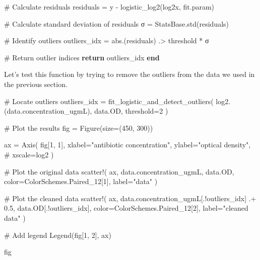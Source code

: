 \documentclass[
]{scrartcl}
\newenvironment{Shaded}{\begin{snugshade}}{\end{snugshade}}
\newcommand{\CommentTok}[1]{\textcolor[rgb]{0.37,0.37,0.37}{#1}}
\newcommand{\ControlFlowTok}[1]{\textcolor[rgb]{0.00,0.23,0.31}{\textbf{#1}}}
\newcommand{\FloatTok}[1]{\textcolor[rgb]{0.68,0.00,0.00}{#1}}
\newcommand{\FunctionTok}[1]{\textcolor[rgb]{0.28,0.35,0.67}{#1}}
\newcommand{\KeywordTok}[1]{\textcolor[rgb]{0.00,0.23,0.31}{\textbf{#1}}}
\newcommand{\NormalTok}[1]{\textcolor[rgb]{0.00,0.23,0.31}{#1}}
\newcommand{\OperatorTok}[1]{\textcolor[rgb]{0.37,0.37,0.37}{#1}}
\newcommand{\StringTok}[1]{\textcolor[rgb]{0.13,0.47,0.30}{#1}}
\begin{document}
\begin{Shaded}
\begin{Highlighting}[]
    \CommentTok{\# Calculate residuals}
\NormalTok{    residuals }\OperatorTok{=}\NormalTok{ y }\OperatorTok{{-}} \FunctionTok{logistic\_log2}\NormalTok{(log2x, fit.param)}

    \CommentTok{\# Calculate standard deviation of residuals}
\NormalTok{    σ }\OperatorTok{=}\NormalTok{ StatsBase.}\FunctionTok{std}\NormalTok{(residuals)}

    \CommentTok{\# Identify outliers}
\NormalTok{    outliers\_idx }\OperatorTok{=} \FunctionTok{abs}\NormalTok{.(residuals) }\OperatorTok{.\textgreater{}}\NormalTok{ threshold }\OperatorTok{*}\NormalTok{ σ}

    \CommentTok{\# Return outlier indices}
    \ControlFlowTok{return}\NormalTok{ outliers\_idx}
\KeywordTok{end}
\end{Highlighting}
\end{Shaded}

Let's test this function by trying to remove the outliers from the data
we used in the previous section.

\begin{Shaded}
\begin{Highlighting}[]
\CommentTok{\# Locate outliers}
\NormalTok{outliers\_idx }\OperatorTok{=} \FunctionTok{fit\_logistic\_and\_detect\_outliers}\NormalTok{(}
    \FunctionTok{log2}\NormalTok{.(data.concentration\_ugmL), data.OD, threshold}\OperatorTok{=}\FloatTok{2}
\NormalTok{)}

\CommentTok{\# Plot the results}
\NormalTok{fig }\OperatorTok{=} \FunctionTok{Figure}\NormalTok{(size}\OperatorTok{=}\NormalTok{(}\FloatTok{450}\NormalTok{, }\FloatTok{300}\NormalTok{))}

\NormalTok{ax }\OperatorTok{=} \FunctionTok{Axis}\NormalTok{(}
\NormalTok{    fig[}\FloatTok{1}\NormalTok{, }\FloatTok{1}\NormalTok{],}
\NormalTok{    xlabel}\OperatorTok{=}\StringTok{"antibiotic concentration"}\NormalTok{,}
\NormalTok{    ylabel}\OperatorTok{=}\StringTok{"optical density"}\NormalTok{,}
    \CommentTok{\# xscale=log2}
\NormalTok{)}

\CommentTok{\# Plot the original data}
\FunctionTok{scatter!}\NormalTok{(}
\NormalTok{    ax,}
\NormalTok{    data.concentration\_ugmL,}
\NormalTok{    data.OD,}
\NormalTok{    color}\OperatorTok{=}\NormalTok{ColorSchemes.Paired\_12[}\FloatTok{1}\NormalTok{],}
\NormalTok{    label}\OperatorTok{=}\StringTok{"data"}
\NormalTok{)}

\CommentTok{\# Plot the cleaned data}
\FunctionTok{scatter!}\NormalTok{(}
\NormalTok{    ax,}
\NormalTok{    data.concentration\_ugmL[.!outliers\_idx] }\OperatorTok{.+} \FloatTok{0.5}\NormalTok{,}
\NormalTok{    data.OD[.!outliers\_idx], color}\OperatorTok{=}\NormalTok{ColorSchemes.Paired\_12[}\FloatTok{2}\NormalTok{],}
\NormalTok{    label}\OperatorTok{=}\StringTok{"cleaned data"}
\NormalTok{)}

\CommentTok{\# Add legend}
\FunctionTok{Legend}\NormalTok{(fig[}\FloatTok{1}\NormalTok{, }\FloatTok{2}\NormalTok{], ax)}

\NormalTok{fig}
\end{Highlighting}
\end{Shaded}
\end{document}
